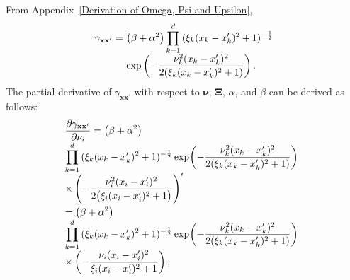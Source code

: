 \documentclass[conference]{IEEEtran}
\begin{document}
	From Appendix~\ref{Derivation of Omega, Psi and Upsilon},
	\begin{equation*}
		\begin{array}{rcl}
			\gamma_{\mathbf{x}\mathbf{x}^\prime}&\hspace{-2.4mm}=&\hspace{-2.4mm}\displaystyle\left(\beta+\alpha^2\right)\prod_{k=1}^{d}{(\xi_k(x_{k}-x^\prime_{k})^2+1)^{-\frac{1}{2}}}\\
			&&\hspace{-2.4mm}\displaystyle\exp\left(-\frac{\nu_k^2(x_{k}-x^\prime_{k})^2}{2(\xi_k(x_{k}-x^\prime_{k})^2+1)}\right).
		\end{array}
	\end{equation*}
	The partial derivative of $\gamma_{\mathbf{x}\mathbf{x}^\prime}$ with respect to $\boldsymbol{\nu}$, $\mathbf{\Xi}$, $\alpha$, and $\beta$ can be derived as follows:
	\begin{equation*}
		\hspace{-1.7mm}
		\begin{array}{l}
			\displaystyle\dfrac{\partial\gamma_{\mathbf{x}\mathbf{x}^\prime}}{\partial\nu_i}\displaystyle=\left(\beta+\alpha^2\right)\\
			\displaystyle\prod_{k=1}^{d}{(\xi_k(x_{k}-x^\prime_{k})^2+1)^{-\frac{1}{2}}}\exp\hspace{-0.5mm}\left(-\frac{\nu_k^2(x_{k}-x^\prime_{k})^2}{2(\xi_k(x_{k}-x^\prime_{k})^2+1)}\right)\\
			\displaystyle\times\left(-\dfrac{\nu_i^2(x_{i}-x^\prime_{i})^2}{2\big(\xi_i(x_{i}-x^\prime_{i})^2+1\big)}\right)^\prime\vspace{1mm}\\
			\displaystyle=\left(\beta+\alpha^2\right)\\
			\displaystyle\prod_{k=1}^{d}{(\xi_k(x_{k}-x^\prime_{k})^2+1)^{-\frac{1}{2}}}\exp\hspace{-0.5mm}\left(-\frac{\nu_k^2(x_{k}-x^\prime_{k})^2}{2(\xi_k(x_{k}-x^\prime_{k})^2+1)}\right)\hspace{-1mm}\\
			\displaystyle\times\left(-\dfrac{\nu_i(x_{i}-x^\prime_{i})^2}{\xi_i(x_{i}-x^\prime_{i})^2+1}\right),
		\end{array}
	\end{equation*}
\end{document}
